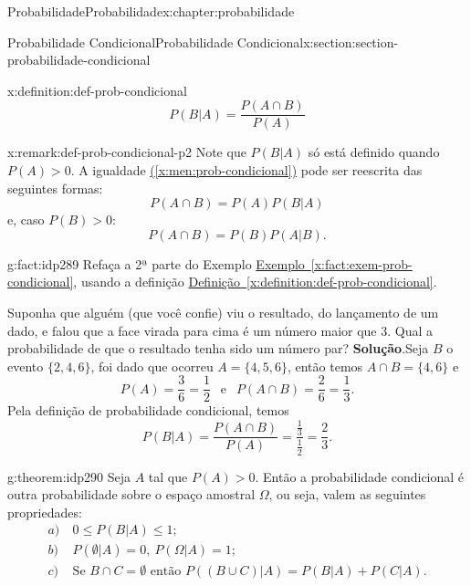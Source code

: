 \documentclass[oneside,10pt,]{book}
\newcommand{\blocktitlefont}{\relax}
\newcommand{\xreffont}{\relax}
\numberwithin{equation}{section}
\newcommand{\amp}{&}
\begin{document}
\begin{chapterptx}{Probabilidade}{}{Probabilidade}{}{}{x:chapter:probabilidade}
\begin{sectionptx}{Probabilidade Condicional}{}{Probabilidade Condicional}{}{}{x:section:section-probabilidade-condicional}
\begin{definition}{}{x:definition:def-prob-condicional}
%
\begin{equation}
P(B|A) = \frac{P(A\cap B)}{P(A)} \label{x:men:prob-condicional}
\end{equation}
\end{definition}
\begin{remark}{}{x:remark:def-prob-condicional-p2}%
Note que \(P(B|A)\) só está definido quando \(P(A)>0\). A igualdade \hyperref[x:men:prob-condicional]{({\xreffont\ref{x:men:prob-condicional}})} pode ser reescrita das seguintes formas:%
\begin{equation*}
P(A\cap B) = P(A)P(B|A) 
\end{equation*}
e, caso \(P(B)> 0\):%
\begin{equation*}
P(A\cap B) = P(B)P(A|B). 
\end{equation*}
\end{remark}
\begin{fact}{}{}{g:fact:idp289}%
Refaça a 2ª parte do Exemplo \hyperref[x:fact:exem-prob-condicional]{Exemplo~{\xreffont\ref{x:fact:exem-prob-condicional}}}, usando a definição \hyperref[x:definition:def-prob-condicional]{Definição~{\xreffont\ref{x:definition:def-prob-condicional}}}.%
\par
Suponha que alguém (que você confie) viu o resultado, do lançamento de um dado, e falou que a face virada para cima é um número maior que 3. Qual a probabilidade de que o resultado tenha sido um número par?%
\textbf{\blocktitlefont Solução}.\quad{}Seja \(B\) o evento \(\{2, 4, 6\}\), foi dado que ocorreu \(A=\{4, 5, 6\}\), então temos \(A\cap B = \{ 4, 6\}\) e%
\begin{equation*}
P(A) = \frac{3}{6} = \frac{1}{2} ~~\text{ e }~~ P(A\cap B) = \frac{2}{6} = \frac{1}{3}. 
\end{equation*}
Pela definição de probabilidade condicional, temos%
\begin{equation*}
P(B|A) = \frac{P(A\cap B)}{P(A)} = \frac{\frac{1}{3}}{\frac{1}{2}} = \frac{2}{3}.
\end{equation*}
%
\end{fact}
\begin{theorem}{}{}{g:theorem:idp290}%
Seja \(A\) tal que \(P(A)>0\). Então a probabilidade condicional é outra probabilidade sobre o espaço amostral \(\Omega\), ou seja, valem as seguintes propriedades:%
\begin{align*}
a) \amp ~ 0\leq P(B|A)\leq 1; \\
b) \amp ~ P(\emptyset|A) = 0,~ P(\Omega|A)=1; \\
c) \amp ~ \text{Se } B\cap C = \emptyset \text{ então } P((B\cup C)|A) = P(B|A) + P(C|A).  

\end{align*}
\end{theorem}
\end{sectionptx}
\end{chapterptx}
\end{document}
